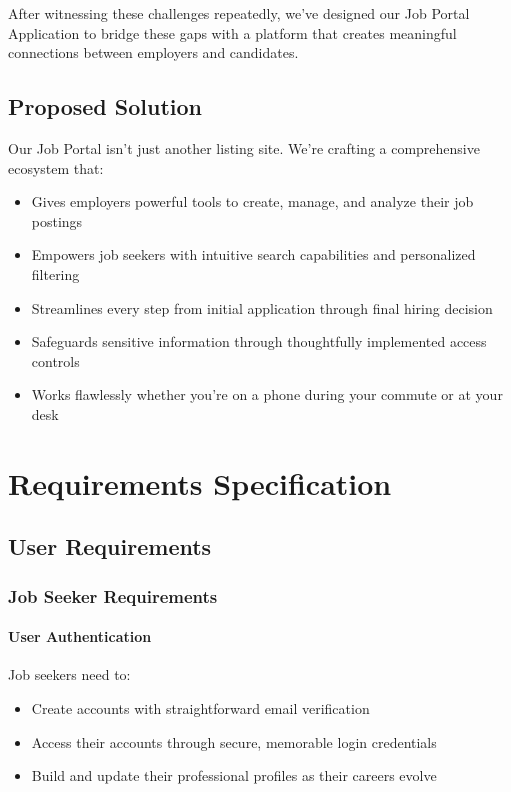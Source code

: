 \documentclass[12pt,a4paper]{article}
\begin{document}
After witnessing these challenges repeatedly, we've designed our Job Portal Application to bridge these gaps with a platform that creates meaningful connections between employers and candidates.

\subsection{Proposed Solution}
Our Job Portal isn't just another listing site. We're crafting a comprehensive ecosystem that:

\begin{itemize}
    \item Gives employers powerful tools to create, manage, and analyze their job postings
    \item Empowers job seekers with intuitive search capabilities and personalized filtering
    \item Streamlines every step from initial application through final hiring decision
    \item Safeguards sensitive information through thoughtfully implemented access controls
    \item Works flawlessly whether you're on a phone during your commute or at your desk
\end{itemize}

\section{Requirements Specification}

\subsection{User Requirements}

\subsubsection{Job Seeker Requirements}

\paragraph{User Authentication}
Job seekers need to:
\begin{itemize}
    \item Create accounts with straightforward email verification
    \item Access their accounts through secure, memorable login credentials 
    \item Build and update their professional profiles as their careers evolve
\end{itemize}
\end{document}
